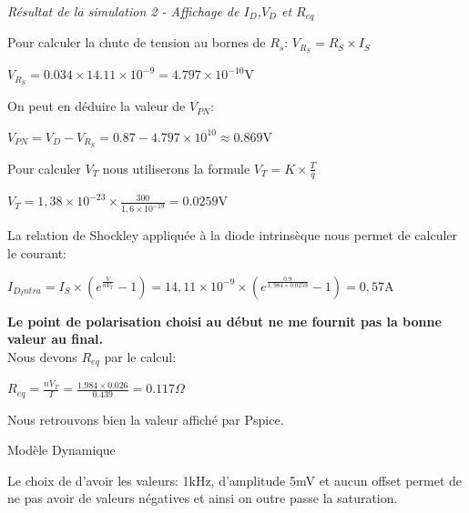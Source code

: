 \documentclass[a4paper,12pt,titlepage]{article}
\begin{document}
\begin{center}
    \textit{Résultat de la simulation 2 - Affichage de $I_D$,$V_D$ et $R_{eq}$}
\end{center}

Pour calculer la chute de tension au bornes de $R_s$:
$V_{R_S} = R_S \times I_S$\\
\begin{center}
    $V_{R_S} = 0.034 \times 14.11 \times 10^{-9} = 4.797 \times 10^{-10}$V
\end{center}

On peut en déduire la valeur de $V_{PN}$:
\begin{center}
    $V_{PN} = V_D - V_{R_S} = 0.87 - 4.797 \times 10^{10} \approx 0.869$V \\
\end{center}

Pour calculer $V_T$ nous utiliserons la formule $V_T = K\times\frac{T}{q}$\\
\begin{center}
    $V_T= 1,38\times 10^{-23} \times \frac{300}{1,6\times 10^{-19}} = 0.0259$V\\
\end{center}

La relation de Shockley appliquée à la diode intrinsèque nous permet de calculer le courant: \\

\begin{center}
    $I_{D_Intra} = I_S \times (e^{\frac{V}{nV_T}}-1) = 14,11\times10^{-9}\times (e^{\frac{0.9}{1,984\times 0.0259}}-1) = 0,57$A\\
\end{center}

\textbf{Le point de polarisation choisi au début ne me fournit pas la bonne valeur au final.}\\

Nous devons $R_{eq}$ par le calcul:
\begin{center}
    $R_{eq} = \frac{nV_T}{I} = \frac{1.984 \times 0.026}{0.439} = 0.117\Omega$\\
\end{center}
Nous retrouvons bien la valeur affiché par Pspice.\\
\vspace{2cm}    
\begin{center}
    Modèle  Dynamique\\
\end{center}   

Le choix de d'avoir les valeurs: 1kHz, d'amplitude 5mV et aucun offset permet de ne pas avoir de valeurs négatives et ainsi on outre passe la saturation.\\
\end{document}
